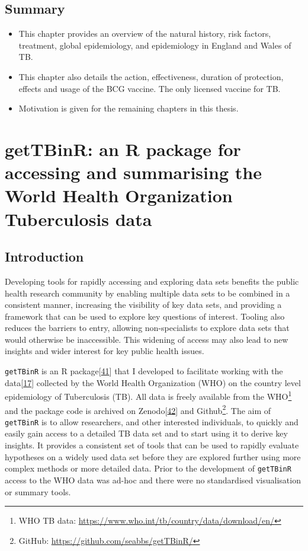 \documentclass[11pt,twoside]{bristolthesis}
\begin{document}
  \hypertarget{summary-1}{%
  \section{Summary}\label{summary-1}}
  \begin{itemize}
  \item
    This chapter provides an overview of the natural history, risk factors, treatment, global epidemiology, and epidemiology in England and Wales of TB.
  \item
    This chapter also details the action, effectiveness, duration of protection, effects and usage of the BCG vaccine. The only licensed vaccine for TB.
  \item
    Motivation is given for the remaining chapters in this thesis.
  \end{itemize}
  \hypertarget{getTBinR}{%
  \chapter{getTBinR: an R package for accessing and summarising the World Health Organization Tuberculosis data}\label{getTBinR}}
  
  \hypertarget{introduction-1}{%
  \section{Introduction}\label{introduction-1}}
  
  Developing tools for rapidly accessing and exploring data sets benefits the public health research community by enabling multiple data sets to be combined in a consistent manner, increasing the visibility of key data sets, and providing a framework that can be used to explore key questions of interest. Tooling also reduces the barriers to entry, allowing non-specialists to explore data sets that would otherwise be inaccessible. This widening of access may also lead to new insights and wider interest for key public health issues.
  
  \texttt{getTBinR} is an R package{[}\protect\hyperlink{ref-RCoreTeam2019}{41}{]} that I developed to facilitate working with the data{[}\protect\hyperlink{ref-WHO:2018}{17}{]} collected by the World Health Organization (WHO) on the country level epidemiology of Tuberculosis (TB). All data is freely available from the WHO\footnote{WHO TB data: \url{https://www.who.int/tb/country/data/download/en/}} and the package code is archived on Zenodo{[}\protect\hyperlink{ref-Abbott:2019}{42}{]} and Github\footnote{GitHub: \url{https://github.com/seabbs/getTBinR/}}. The aim of \texttt{getTBinR} is to allow researchers, and other interested individuals, to quickly and easily gain access to a detailed TB data set and to start using it to derive key insights. It provides a consistent set of tools that can be used to rapidly evaluate hypotheses on a widely used data set before they are explored further using more complex methods or more detailed data. Prior to the development of \texttt{getTBinR} access to the WHO data was ad-hoc and there were no standardised visualisation or summary tools.
  
\end{document}
